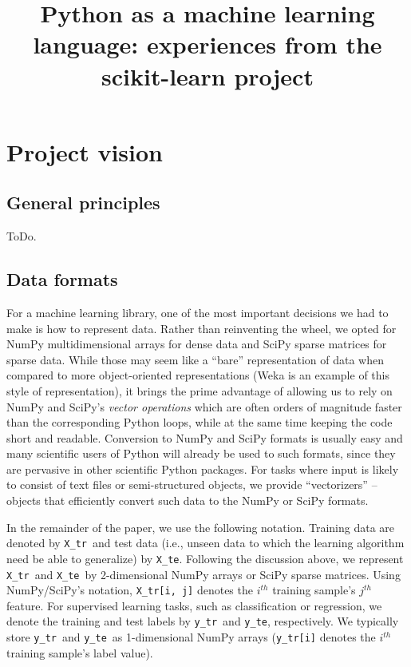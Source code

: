 \documentclass[a4paper]{article}
\title{Python as a machine learning language:
       experiences from the scikit-learn project}
\newcommand{\Xtr}{\texttt{X\_tr}}
\newcommand{\Xte}{\texttt{X\_te}}
\newcommand{\ytr}{\texttt{y\_tr}}
\newcommand{\yte}{\texttt{y\_te}}
\begin{document}
\maketitle

\section{Project vision}

\subsection{General principles}

ToDo.

\subsection{Data formats}

For a machine learning library, one of the most important decisions we had to
make is how to represent data.  Rather than reinventing the wheel, we opted for
NumPy multidimensional arrays  for dense data and SciPy
sparse matrices for sparse data.  While those may seem like a ``bare''
representation of data when compared to more object-oriented representations
(Weka is an example of this style of representation), it brings the prime
advantage of allowing us to rely on NumPy and SciPy's \textit{vector
operations} which are often orders of magnitude faster than the corresponding
Python loops, while at the same time keeping the code short and readable.
Conversion to NumPy and SciPy formats is usually easy and many scientific users
of Python will already be used to such formats, since they are pervasive in
other scientific Python packages.  For tasks where input is likely to consist
of text files or semi-structured objects, we provide ``vectorizers'' -- objects
that efficiently convert such data to the NumPy or SciPy formats.

In the remainder of the paper, we use the following notation. Training data are
denoted by \Xtr ~and test data (i.e., unseen data to which the learning
algorithm need be able to generalize) by \Xte.  Following the discussion above,
we represent \Xtr ~and \Xte ~by 2-dimensional NumPy arrays or SciPy sparse
matrices. Using NumPy/SciPy's notation, \Xtr\texttt{[i, j]} denotes the
$i^{th}$ training sample's $j^{th}$ feature. For supervised learning tasks,
such as classification or regression, we denote the training and test labels by
\ytr ~and \yte, respectively. We typically store \ytr ~and \yte ~as
1-dimensional NumPy arrays (\ytr\texttt{[i]} denotes the $i^{th}$ training
sample's label value).
\end{document}
